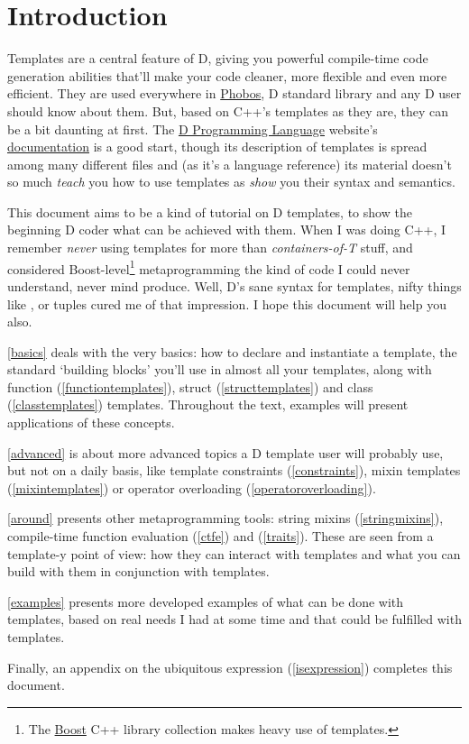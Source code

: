 \newpage
{}
\part*{Introduction}\label{intro} %

Templates are a central feature of D, giving you powerful compile-time code generation abilities that'll make your code cleaner, more flexible and even more efficient. They are used everywhere in \href{http://www.dlang.org/phobos.html}{Phobos}, D standard library and any D user should know about them. But, based on C++'s templates as they are, they can be a bit daunting at first. The \href{http://www.dlang.org}{D Programming Language} website's \href{http://www.dlang.org/templates.html}{documentation} is a good start, though its description of templates is spread among many different files and (as it's a language reference) its material doesn't so much \emph{teach} you how to use templates as \emph{show} you their syntax and semantics.

This document aims to be a kind of tutorial on D templates, to show the beginning D coder what can be achieved with them. When I was doing C++, I remember \emph{never} using templates for more than \emph{containers-of-T} stuff, and considered Boost-level\footnote{ The \href{htpp://www.boost.org}{Boost} C++ library collection makes heavy use of templates.} metaprogramming the kind of code I could never understand, never mind produce. Well, D's sane syntax for templates, nifty things like ,  or tuples cured me of that impression. I hope this document will help you also.

\autoref{basics} deals with the very basics: how to declare and instantiate a template, the standard `building blocks' you'll use in almost all your templates, along with function (\ref{functiontemplates}), struct (\ref{structtemplates}) and class (\ref{classtemplates}) templates. Throughout the text, examples will present applications of these concepts. 

\autoref{advanced} is about more advanced topics a D template user will probably use, but not on a daily basis, like template constraints (\ref{constraints}), mixin templates (\ref{mixintemplates}) or operator overloading (\ref{operatoroverloading}). 

\autoref{around} presents other meta\-pro\-gram\-ming tools: string mixins (\ref{stringmixins}), compile-time function evaluation (\ref{ctfe}) and  (\ref{traits}). These are seen from a template-y point of view: how they can interact with templates and what you can build with them in conjunction with templates.

\autoref{examples} presents more developed examples of what can be done with templates, based on real needs I had at some time and that could be fulfilled with templates.

Finally, an appendix on the ubiquitous  expression (\ref{isexpression}) completes this document.
